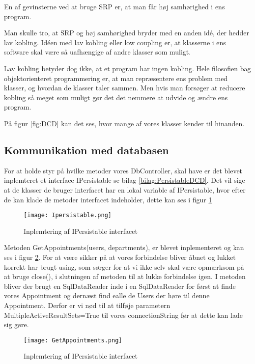 En af gevinsterne ved at bruge SRP er, at man får høj samhørighed i ens program.

Man skulle tro, at SRP og høj samhørighed bryder med en anden idé, der hedder lav kobling.     
Idéen med lav kobling eller low coupling er, at klasserne i ens software skal være så uafhængige af andre klasser som muligt.

Lav kobling betyder dog ikke, at et program har ingen kobling.
Hele filosofien bag objektorienteret programmering er, at man repræsentere ens problem med klasser, og hvordan de klasser taler sammen.
Men hvis man forsøger at reducere kobling så meget som muligt gør det det nemmere at udvide og ændre ens program.

På figur \ref{fig:DCD} kan det ses, hvor mange af vores klasser kender til hinanden.

\subsection{Kommunikation med databasen}

For at holde styr på hvilke metoder vores DbController, skal have er det blevet inplemteret et interface IPersistable se bilag \ref{bilag:PersistableDCD}.
Det vil sige at de klasser de bruger interfacet har en lokal variable af IPersistable, hvor efter de kan klade de metoder interfacet indeholder, dette kan ses i figur \ref{fig:Persistable}

\begin{figure}[h]
    \caption{Inplemtering af IPersistable interfacet}
    \centering
        \texttt{[image: Ipersistable.png]}
    \label{fig:Persistable}
\end{figure}

Metoden GetAppointments(users, departments), er blevet inplementeret og kan ses i figur \ref{fig:GetAppointments}.
For at være sikker på at vores forbindelse bliver åbnet og lukket korrekt har brugt using, som sørger for at vi ikke selv skal være opmærksom på at bruge close(), i slutningen af metoden til at lukke forbindelse igen.
I metoden bliver der brugt en SqlDataReader inde i en SqlDataReader for først at finde vores Appointment og dernæst find ealle de Users der høre til denne Appointment.
Derfor er vi nød til at tilføje parametern MultipleActiveResultSets=True til vores connectionString før at dette kan lade sig gøre.

\begin{figure}[h]
    \caption{Inplemtering af IPersistable interfacet}
    \centering
        \texttt{[image: GetAppointments.png]}
    \label{fig:GetAppointments}
\end{figure}
